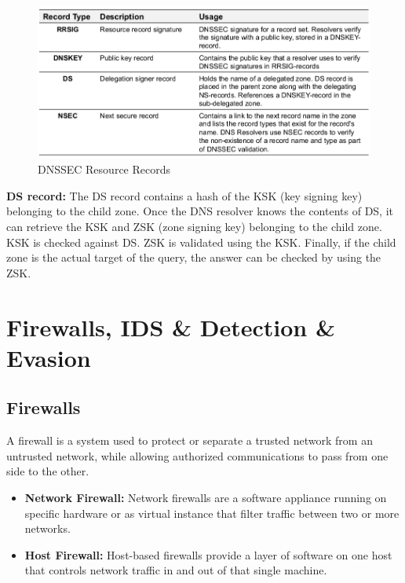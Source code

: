 \documentclass[11pt,oneside,a4paper]{article}
\begin{document}
\begin{figure}[hb]
	\centering
	\includegraphics[width=0.8\linewidth]{figures/dnssec_resource_records}
	\caption{DNSSEC Resource Records}
	\label{fig:dnssecresourcerecords}
\end{figure}

\noindent \textbf{DS record:} The DS record contains a hash of the KSK (key signing key) belonging to the
child zone. Once the DNS resolver knows the contents of DS, it can retrieve the KSK and ZSK (zone
signing key) belonging to the child zone. KSK is checked against DS. ZSK is validated using
the KSK. Finally, if the child zone is the actual target of the query, the answer
can be checked by using the ZSK.

\newpage

\section{Firewalls, IDS \& Detection \& Evasion}

\subsection{Firewalls}

A firewall is a system used to protect or separate a trusted network from an untrusted network, while allowing authorized communications to pass from one side to the other.

\vspace{-\topsep}
\begin{itemize}
	\setlength{\itemsep}{0pt}
	\setlength{\parskip}{0pt}
	\item \textbf{Network Firewall:} Network firewalls are a software appliance running on specific hardware or as virtual instance that filter traffic between two or more networks.
	\item \textbf{Host Firewall:} Host-based firewalls provide a layer of software on one host that controls network traffic in and out of	that single machine.
\end{itemize}
\vspace{-\topsep}
\end{document}
